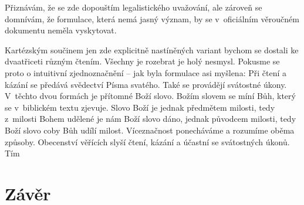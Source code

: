 Přiznávám, že se zde dopouštím legalistického uvažování, ale zároveň se
domnívám, že formulace, která nemá jasný význam, by se  v~oficiálním
věroučném dokumentu neměla vyskytovat.

Kartézským součinem jen zde explicitně nastíněných variant bychom se dostali ke
dvaatřiceti různým čtením. Všechny je rozebrat je holý nesmysl. Pokusme se proto o
intuitivní zjednoznačnění -- jak byla formulace asi myšlena: Při čtení a kázání
se předává svědectví Písma svatého. Také se provádějí svátostné úkony. V~těchto
dvou formách je přítomné Boží slovo. Božím slovem se míní Bůh, který se
v~biblickém textu zjevuje. Slovo Boží je jednak předmětem milosti, tedy
z~milosti Bohem udělené je nám Boží slovo dáno, jednak původcem milosti, tedy
Boží slovo coby Bůh udílí milost. Víceznačnost ponecháváme a rozumíme oběma
způsoby. Obecenství věřících slyší čtení, kázání a účastní se svátostných úkonů.
Tím

\vspace{15mm}
\chapter{Závěr}
\label{div:zaver}

